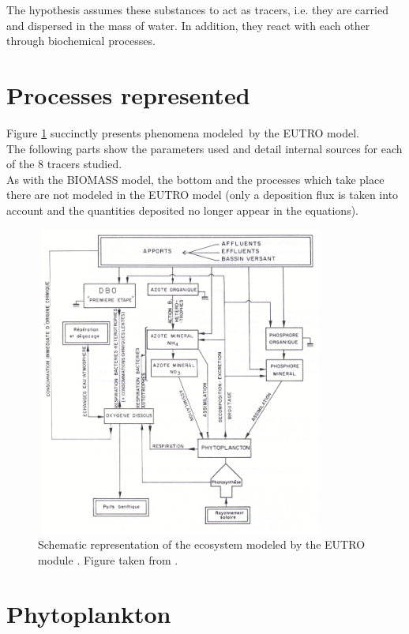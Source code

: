 The hypothesis assumes these substances to act as tracers,
i.e. they are carried and dispersed in the mass of water.
In addition, they react with each other through biochemical processes.

\section{Processes represented}

Figure \ref{ecosyst_scheme} succinctly presents phenomena modeled\ by the EUTRO model.\\

The following parts show the parameters used and detail internal sources for each of the 8 tracers studied.\\

As with the BIOMASS model, the bottom and the processes which take place there are not modeled in the EUTRO model
(only a deposition flux is taken into account and the quantities deposited no longer appear in the equations).\\

\begin{figure}[H]
  \centering
  \includegraphics[width=3.76in,height=4.01in]{graphics/image38.png}
  \caption{Schematic representation of the ecosystem modeled by the EUTRO module \cite{gosse_doubs_1989}.
    Figure taken from \cite{elkadi_tracer_2012}.}
  \label{ecosyst_scheme}
\end{figure}

\section{Phytoplankton}

